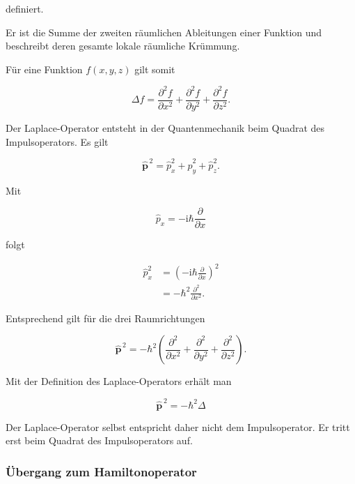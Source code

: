 definiert.

Er ist die Summe der zweiten räumlichen Ableitungen einer Funktion und
beschreibt deren gesamte lokale räumliche Krümmung.

Für eine Funktion \(f(x,y,z)\) gilt somit

\begin{equation}
	\Delta f
	=
	\frac{\partial^2 f}{\partial x^2}
	+
	\frac{\partial^2 f}{\partial y^2}
	+
	\frac{\partial^2 f}{\partial z^2}.
\end{equation}

Der Laplace-Operator entsteht in der Quantenmechanik beim Quadrat des
Impulsoperators. Es gilt

\begin{equation}
	\hat{\mathbf{p}}^{\,2}
	=
	\hat{p}_x^2
	+
	\hat{p}_y^2
	+
	\hat{p}_z^2.
\end{equation}

Mit

\begin{equation}
	\hat{p}_x
	=
	-\mathrm{i}\hbar
	\frac{\partial}{\partial x}
\end{equation}

folgt

\begin{align}
	\hat{p}_x^2
	&=
	\left(
	-\mathrm{i}\hbar
	\frac{\partial}{\partial x}
	\right)^2
	\\
	&=
	-\hbar^2
	\frac{\partial^2}{\partial x^2}.
\end{align}

Entsprechend gilt für die drei Raumrichtungen

\begin{equation}
	\hat{\mathbf{p}}^{\,2}
	=
	-\hbar^2
	\left(
	\frac{\partial^2}{\partial x^2}
	+
	\frac{\partial^2}{\partial y^2}
	+
	\frac{\partial^2}{\partial z^2}
	\right).
\end{equation}

Mit der Definition des Laplace-Operators erhält man

\begin{equation}
	\boxed{
		\hat{\mathbf{p}}^{\,2}
		=
		-\hbar^2\Delta
	}
	\label{eq:app_impulsquadrat_laplace}
\end{equation}

Der Laplace-Operator selbst entspricht daher nicht dem Impulsoperator.
Er tritt erst beim Quadrat des Impulsoperators auf.

\subsubsection*{Übergang zum Hamiltonoperator}

